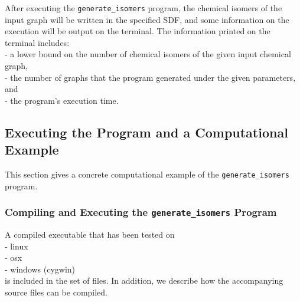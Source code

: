 \documentclass[11pt,titlepage,dvipdfmx,twoside]{book}
\begin{document}
After executing the {\tt generate\_isomers} program,
the chemical isomers of the input graph will be written
in the specified SDF, and some information on the execution will be output on 
the terminal.
The information printed on the terminal includes:\\
 - a lower bound on the number of chemical isomers of the given input chemical graph, \\
 - the number of graphs that the program generated under the given parameters, and \\
 - the program's execution time.
 


\subsection{Executing the Program and a Computational Example}
\label{sec:Example_m}

This section gives a concrete computational example of the {\tt generate\_isomers} program.


\subsubsection{Compiling and Executing the {\tt generate\_isomers} Program}
\label{sec:compile_m}

A compiled executable that has been tested on \\
- linux \\
- osx \\
- windows (cygwin) \\
is included in the set of files.
In addition, we describe how the accompanying source files can be compiled.
\end{document}
